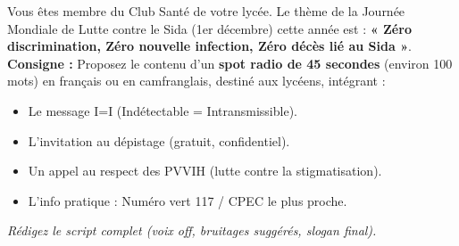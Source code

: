 \documentclass[11pt]{article}
\begin{document}
\begin{exercice}
Vous êtes membre du Club Santé de votre lycée. Le thème de la Journée Mondiale de Lutte contre le Sida (1er décembre) cette année est : \textbf{« Zéro discrimination, Zéro nouvelle infection, Zéro décès lié au Sida »}.
\textbf{Consigne :} Proposez le contenu d'un \textbf{spot radio de 45 secondes} (environ 100 mots) en français ou en camfranglais, destiné aux lycéens, intégrant :
\begin{itemize}
    \item Le message I=I (Indétectable = Intransmissible).
    \item L'invitation au dépistage (gratuit, confidentiel).
    \item Un appel au respect des PVVIH (lutte contre la stigmatisation).
    \item L'info pratique : Numéro vert 117 / CPEC le plus proche.
\end{itemize}
\textit{Rédigez le script complet (voix off, bruitages suggérés, slogan final).}
\end{exercice}

\end{document}
